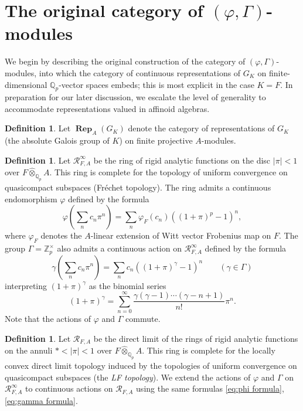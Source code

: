 \documentclass[12pt]{amsart}
\theoremstyle{definition}
\newtheorem{defn}[theorem]{Definition}
\numberwithin{equation}{theorem}
\newcommand{\QQ}{\mathbb{Q}}
\newcommand{\ZZ}{\mathbb{Z}}
\newcommand{\calR}{\mathcal{R}}
\DeclareMathOperator{\Rep}{\mathbf{Rep}}
\begin{document}
\section{The original category of $(\varphi, \Gamma)$-modules}
\label{sec:categories}

We begin by describing the original construction of the category of $(\varphi, \Gamma)$-modules,
into which the category of continuous representations of $G_K$ on finite-dimensional $\QQ_p$-vector spaces embeds; this is most explicit in the case $K=F$.
In preparation for our later discussion, we escalate the level of generality to accommodate representations valued in affinoid algebras.

\begin{defn}
Let $\Rep_A(G_K)$ denote the category of representations of $G_K$ (the absolute Galois group of $K$) on finite projective $A$-modules.
\end{defn}

\begin{defn}
Let $\calR^\infty_{F,A}$ be the ring of rigid analytic functions on the disc $\left| \pi \right| < 1$ over $F \widehat{\otimes}_{\QQ_p} A$. This ring is complete for the topology of uniform convergence on quasicompact subspaces (Fr\'echet topology). The ring admits a continuous endomorphism $\varphi$ defined by the formula
\begin{equation} \label{eq:phi formula}
\varphi \left( \sum_n c_n \pi^n \right) =  \sum_n \varphi_F(c_n) ((1 + \pi)^p-1)^n,
\end{equation}
where $\varphi_F$ denotes the $A$-linear extension of Witt vector Frobenius map on $F$.
The group $\Gamma = \ZZ_p^\times$ also admits a continuous action on $\calR^\infty_{F,A}$ defined by the formula
\begin{equation} \label{eq:gamma formula}
\gamma \left( \sum_n c_n \pi^n \right) = \sum_n c_n ((1 + \pi)^\gamma-1)^n \qquad (\gamma \in \Gamma)
\end{equation}
interpreting $(1 + \pi)^\gamma$ as the binomial series 
\[
(1 + \pi)^\gamma = \sum_{n=0}^\infty \frac{\gamma(\gamma-1)\cdots (\gamma-n+1)}{n!} \pi^n.
\]
Note that the actions of $\varphi$ and $\Gamma$ commute.
\end{defn}

\begin{defn}
Let $\calR_{F,A}$ be the direct limit of the rings of rigid analytic functions on the annuli $* < \left| \pi \right| < 1$ over $F \widehat{\otimes}_{\QQ_p} A$. This ring is complete for the locally convex direct limit topology induced by the topologies of uniform convergence on quasicompact subspaces (the \emph{LF topology}). We extend the actions of $\varphi$ and $\Gamma$ on $\calR^\infty_{F,A}$ to continuous actions on $\calR_{F,A}$ using the same formulas \eqref{eq:phi formula}, \eqref{eq:gamma formula}.
\end{defn}
\end{document}
